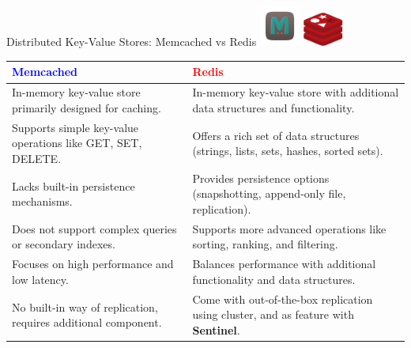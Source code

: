 \documentclass{beamer}
\begin{document}
\begin{frame}{Distributed Key-Value Stores: Memcached vs Redis}
	\includegraphics[width=0.1\textwidth]{img/memcached_image.png}		\hfill
    \includegraphics[width=0.1\textwidth]{img/redis_image.png}
  \begin{table}[h]
    \centering
    \footnotesize
    \renewcommand{\arraystretch}{1.5}
    \begin{tabular}{|p{}|p{}|}
      \hline
      \rowcolor[RGB]{232,232,232}
      \textbf{\textcolor{blue}{Memcached}} & \textbf{\textcolor{red}{Redis}} \\
      \hline
      In-memory key-value store primarily designed for caching.
      & 
      In-memory key-value store with additional data structures and functionality.
      \\
      \hline
      Supports simple key-value operations like GET, SET, DELETE. &
      Offers a rich set of data structures (strings, lists, sets, hashes, sorted sets). \\
      \hline
      Lacks built-in persistence mechanisms. &
      Provides persistence options (snapshotting, append-only file, replication). \\
      \hline
      Does not support complex queries or secondary indexes. &
      Supports more advanced operations like sorting, ranking, and filtering. \\
      \hline
      Focuses on high performance and low latency. &
      Balances performance with additional functionality and data structures. \\
      \hline
      No built-in way of replication, requires additional component. &
      Come with out-of-the-box replication using cluster, and as feature with \textbf{Sentinel}. \\
      \hline
    \end{tabular}
  \end{table}
\end{frame}
\end{document}
